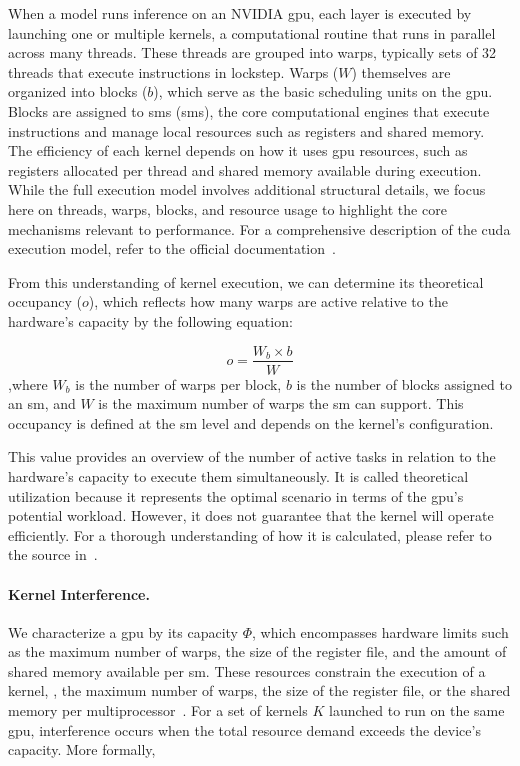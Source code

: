 When a model runs inference on an NVIDIA \acrshort{gpu}, each layer is executed by launching one or multiple kernels, a computational routine that runs in parallel across many threads. These threads are grouped into warps, typically sets of 32 threads that execute instructions in lockstep. Warps ($W$) themselves are organized into blocks ($b$), which serve as the basic scheduling units on the \acrshort{gpu}. Blocks are assigned to \acrlong{sm}s (\acrshort{sm}s), the core computational engines that execute instructions and manage local resources such as registers and shared memory. The efficiency of each kernel depends on how it uses \acrshort{gpu} resources, such as registers allocated per thread and shared memory available during execution. While the full execution model involves additional structural details, we focus here on threads, warps, blocks, and resource usage to highlight the core mechanisms relevant to performance. For a comprehensive description of the \acrshort{cuda} execution model, refer to the official documentation~\cite{nvidia2025cuda}.

From this understanding of kernel execution, we can determine its theoretical occupancy ($o$), which reflects how many warps are active relative to the hardware's capacity by the following equation:

\begin{equation}\label{eq:occupancy}
	o = \frac{W_b \times b}{W}
\end{equation}
,where $W_b$ is the number of warps per block, $b$ is the number of blocks assigned to an \acrshort{sm}, and $W$ is the maximum number of warps the \acrshort{sm} can support. This occupancy is defined at the \acrshort{sm} level and depends on the kernel's configuration.

This value provides an overview of the number of active tasks in relation to the hardware's capacity to execute them simultaneously. It is called theoretical utilization because it represents the optimal scenario in terms of the \acrshort{gpu}'s potential workload. However, it does not guarantee that the kernel will operate efficiently. For a thorough understanding of how it is calculated, please refer to the source in~\cite{lim2017autotuninggpukernelsstatic}.

\paragraph{Kernel Interference.} We characterize a \acrshort{gpu} by its capacity $\Phi$, which encompasses hardware limits such as the maximum number of warps, the size of the register file, and the amount of shared memory available per \acrfull{sm}. These resources constrain the execution of a kernel, \eg, the maximum number of warps, the size of the register file, or the shared memory per multiprocessor~\cite{lim2017autotuninggpukernelsstatic}. For a set of kernels $K$ launched to run on the same \acrshort{gpu}, interference occurs when the total resource demand exceeds the device's capacity. More formally,

